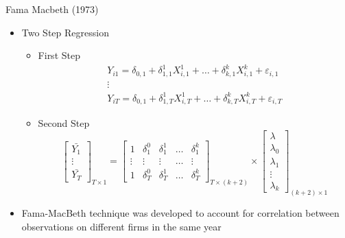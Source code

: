 \documentclass{beamer}
\begin{document}
\begin{frame}{Fama Macbeth (1973)}
\begin{itemize}

\item Two Step Regression
\begin{itemize}
 \item First Step
 \begin{equation*}
\begin{array}{c}
Y_{i1} = \delta_{0,1} + \delta_{1,1}^1 X^1_{i,1} + \dots  + \delta_{k,1}^k X^k_{i,1}  + \varepsilon_{i,1}\\
\vdots\\
Y_{iT} = \delta_{0,1} + \delta_{1,T}^1 X^1_{i,T} + \dots  + \delta_{k,T}^k X^k_{i,T}  + \varepsilon_{i,T}
\end{array}
\end{equation*}



\item Second Step
\begin{equation*}
\left[\begin{matrix}
\bar{Y_1}\\
\vdots\\
\bar{Y_T}
\end{matrix}\right]_{T\times 1} =
 \left[\begin{matrix}
1 &  \delta_1^0 &  \delta_1^1 & \dots  &  \delta_1^k\\
\vdots&  \vdots &  \vdots &  \dots &  \vdots\\
1 &  \delta_T^0 &  \delta_T^1 & \dots &  \delta_T^k
\end{matrix}\right]_{T\times (k+2)}
\times \left[\begin{matrix}
\lambda\\
\lambda_0\\
\lambda_1\\
\vdots\\
\lambda_k
\end{matrix}\right] _{(k+2)\times 1}
\end{equation*}


\end{itemize}
\item Fama-MacBeth technique was
developed to account for correlation between observations on different firms in the same year
\end{itemize}
\end{frame}
\end{document}
